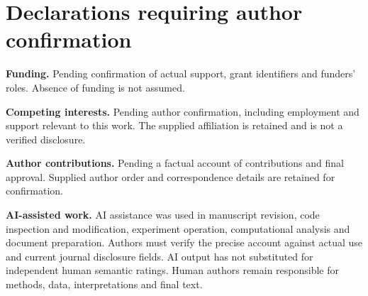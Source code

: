 \documentclass[12pt,a4paper]{article}
\begin{document}
\section*{Declarations requiring author confirmation}
\textbf{Funding.} Pending confirmation of actual support, grant identifiers and funders' roles. Absence of funding is not assumed.

\textbf{Competing interests.} Pending author confirmation, including employment and support relevant to this work. The supplied affiliation is retained and is not a verified disclosure.

\textbf{Author contributions.} Pending a factual account of contributions and final approval. Supplied author order and correspondence details are retained for confirmation.

\textbf{AI-assisted work.} AI assistance was used in manuscript revision, code inspection and modification, experiment operation, computational analysis and document preparation. Authors must verify the precise account against actual use and current journal disclosure fields. AI output has not substituted for independent human semantic ratings. Human authors remain responsible for methods, data, interpretations and final text.




\end{document}
